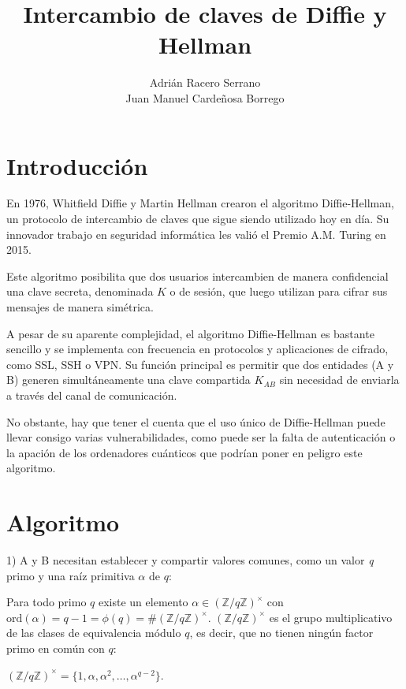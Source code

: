 \documentclass[11pt]{article}
\title{\textbf{\huge Intercambio de claves de Diffie y Hellman}}
\author{Adrián Racero Serrano\\Juan Manuel Cardeñosa Borrego}
\date{}
\begin{document}
\maketitle

\thispagestyle{empty}

\newpage

\setcounter{page}{1}
\tableofcontents

\newpage

\section{Introducción}
En 1976, Whitfield Diffie y Martin Hellman crearon el algoritmo Diffie-Hellman, un protocolo de intercambio de claves que sigue siendo utilizado hoy en día. Su innovador trabajo en seguridad informática les valió el Premio A.M. Turing en 2015.

Este algoritmo posibilita que dos usuarios intercambien de manera confidencial una clave secreta, denominada $K$ o de sesión, que luego utilizan para cifrar sus mensajes de manera simétrica.

A pesar de su aparente complejidad, el algoritmo Diffie-Hellman es bastante sencillo y se implementa con frecuencia en protocolos y aplicaciones de cifrado, como SSL, SSH o VPN. Su función principal es permitir que dos entidades (A y B) generen simultáneamente una clave compartida $K_{AB}$ sin necesidad de enviarla a través del canal de comunicación.

No obstante, hay que tener el cuenta que el uso único de Diffie-Hellman puede llevar consigo varias vulnerabilidades, como puede ser la falta de autenticación o la apación de los ordenadores cuánticos que podrían poner en peligro este algoritmo.

\section{Algoritmo}
1) A y B necesitan establecer y compartir valores comunes, como un valor \textit{q} primo y una raíz primitiva $\alpha$  de $q$:

Para todo primo $q$ existe un elemento $\alpha \in (\mathbb{Z}/q\mathbb{Z})^{\times}$ con $\text{ord}(\alpha) = q - 1 = \phi(q) =  \# (\mathbb{Z}/q\mathbb{Z})^{\times}$.
$(\mathbb{Z}/q\mathbb{Z})^{\times}$ es el grupo multiplicativo de las clases de equivalencia módulo $q$, es decir, que no tienen ningún factor primo en común con $q$:
\begin{center}
$(\mathbb{Z}/q\mathbb{Z})^{\times} = \{1, \alpha, \alpha^2, \ldots, \alpha^{q-2}\}$.\\
\end{center}
\end{document}
